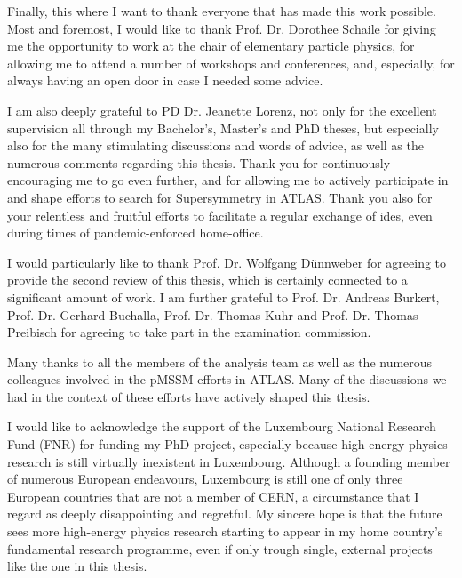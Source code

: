 
\begin{acknowledgements}[Acknowledgements]  

Finally, this where I want to thank everyone that has made this work possible. Most and foremost, I would like to thank Prof.\@\xspace Dr.\@\xspace Dorothee Schaile for giving me the opportunity to work at the chair of elementary particle physics, for allowing me to attend a number of workshops and conferences, and, especially, for always having an open door in case I needed some advice.

I am also deeply grateful to PD\@\xspace Dr.\@\xspace Jeanette Lorenz, not only for the excellent supervision all through my Bachelor's, Master's and PhD theses, but especially also for the many stimulating discussions and words of advice, as well as the numerous comments regarding this thesis. Thank you for continuously encouraging me to go even further, and for allowing me to actively participate in and shape efforts to search for Supersymmetry in ATLAS. Thank you also for your relentless and fruitful efforts to facilitate a regular exchange of ides, even during times of pandemic-enforced home-office.

I would particularly like to thank Prof.\@\xspace Dr.\@\xspace Wolfgang D\"unnweber for agreeing to provide the second review of this thesis, which is certainly connected to a significant amount of work. I am further grateful to Prof.\@\xspace Dr.\@\xspace Andreas Burkert, Prof.\@\xspace Dr.\@\xspace Gerhard Buchalla, Prof.\@\xspace Dr.\@\xspace Thomas Kuhr and Prof.\@\xspace Dr.\@\xspace Thomas Preibisch for agreeing to take part in the examination commission.

Many thanks to all the members of the \onelepton analysis team as well as the numerous colleagues involved in the pMSSM efforts in ATLAS. Many of the discussions we had in the context of these efforts have actively shaped this thesis.

I would like to acknowledge the support of the Luxembourg National Research Fund (FNR) for funding my PhD project, especially because high-energy physics research is still virtually inexistent in Luxembourg. Although a founding member of numerous European endeavours, Luxembourg is still one of only three European countries that are not a member of CERN, a circumstance that I regard as deeply disappointing and regretful. My sincere hope is that the future sees more high-energy physics research starting to appear in my home country's fundamental research programme, even if only trough single, external projects like the one in this thesis. 


\end{acknowledgements}
